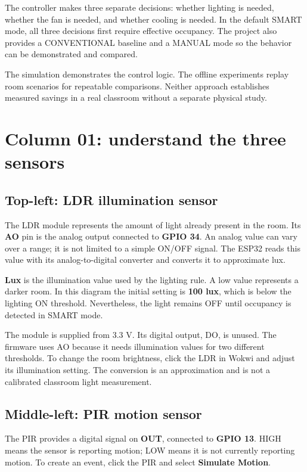 \documentclass[11pt,a4paper]{article}
\begin{document}
The controller makes three separate decisions: whether lighting is
needed, whether the fan is needed, and whether cooling is needed. In the
default SMART mode, all three decisions first require effective
occupancy. The project also provides a CONVENTIONAL baseline and a MANUAL
mode so the behavior can be demonstrated and compared.

The simulation demonstrates the control logic. The offline experiments
replay room scenarios for repeatable comparisons. Neither approach
establishes measured savings in a real classroom without a separate
physical study.

\section{Column 01: understand the three sensors}
\subsection{Top-left: LDR illumination sensor}
The LDR module represents the amount of light already present in the
room. Its \textbf{AO} pin is the analog output connected to
\textbf{GPIO 34}. An analog value can vary over a range; it is not limited
to a simple ON/OFF signal. The ESP32 reads this value with its
analog-to-digital converter and converts it to approximate lux.

\textbf{Lux} is the illumination value used by the lighting rule. A low
value represents a darker room. In this diagram the initial setting is
\textbf{100 lux}, which is below the lighting ON threshold. Nevertheless,
the light remains OFF until occupancy is detected in SMART mode.

The module is supplied from 3.3 V. Its digital output, DO, is unused.
The firmware uses AO because it needs illumination values for two
different thresholds. To change the room brightness, click the LDR in
Wokwi and adjust its illumination setting. The conversion is an
approximation and is not a calibrated classroom light measurement.

\subsection{Middle-left: PIR motion sensor}
The PIR provides a digital signal on \textbf{OUT}, connected to
\textbf{GPIO 13}. HIGH means the sensor is reporting motion; LOW means it
is not currently reporting motion. To create an event, click the PIR
and select \textbf{Simulate Motion}.
\end{document}
